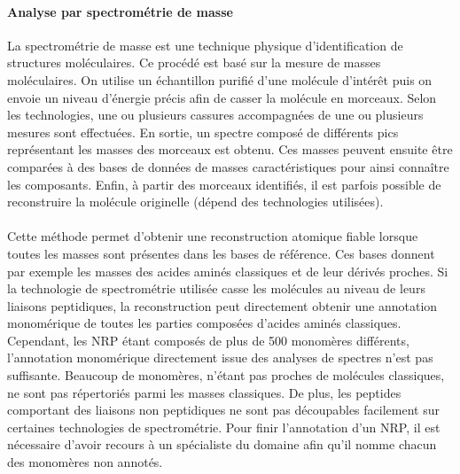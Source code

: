 \documentclass[12pt,french,twoside]{report}
\begin{document}
\paragraph{Analyse par spectrométrie de masse}
La spectrométrie de masse est une technique physique d'identification de structures moléculaires.
Ce procédé est basé sur la mesure de masses moléculaires.
On utilise un échantillon purifié d'une molécule d'intérêt puis on envoie un niveau d'énergie précis afin de casser la molécule en morceaux.
Selon les technologies, une ou plusieurs cassures accompagnées de une ou plusieurs mesures sont effectuées.
En sortie, un spectre composé de différents pics représentant les masses des morceaux est obtenu.
Ces masses peuvent ensuite être comparées à des bases de données de masses caractéristiques pour ainsi connaître les composants.
Enfin, à partir des morceaux identifiés, il est parfois possible de reconstruire la molécule originelle (dépend des technologies utilisées).

\paragraph{}Cette méthode permet d'obtenir une reconstruction atomique fiable lorsque toutes les masses sont présentes dans les bases de référence.
Ces bases donnent par exemple les masses des acides aminés classiques et de leur dérivés proches.
Si la technologie de spectrométrie utilisée casse les molécules au niveau de leurs liaisons peptidiques, la reconstruction peut directement obtenir une annotation monomérique de toutes les parties composées d'acides aminés classiques.
Cependant, les NRP étant composés de plus de 500 monomères différents, l'annotation monomérique directement issue des analyses de spectres n'est pas suffisante.
Beaucoup de monomères, n'étant pas proches de molécules classiques, ne sont pas répertoriés parmi les masses classiques.
De plus, les peptides comportant des liaisons non peptidiques ne sont pas découpables facilement sur certaines technologies de spectrométrie.
Pour finir l'annotation d'un NRP, il est nécessaire d'avoir recours à un spécialiste du domaine afin qu'il nomme chacun des monomères non annotés.
\end{document}
